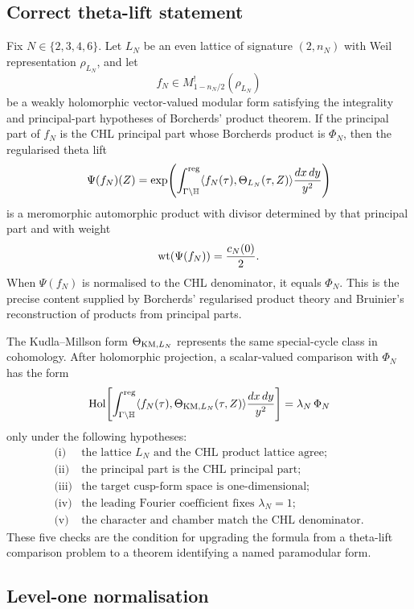 \subsection*{Correct theta-lift statement}

Fix \(N\in\{2,3,4,6\}\).  Let \(L_N\) be an even lattice of signature
\((2,n_N)\) with Weil representation \(\rho_{L_N}\), and let
\[
  f_N\in M^{!}_{1-n_N/2}(\rho_{L_N})
\]
be a weakly holomorphic vector-valued modular form satisfying the
integrality and principal-part hypotheses of Borcherds' product
theorem.  If the principal part of \(f_N\) is the CHL principal part
whose Borcherds product is \(\Phi_N\), then the regularised theta lift
\[
  \Psi(f_N)(Z)
  =
  \exp\!\left(
  \int_{\Gamma\backslash\mathbb{H}}^{\mathrm{reg}}
  \langle f_N(\tau),\Theta_{L_N}(\tau,Z)\rangle
  \frac{dx\,dy}{y^2}
  \right)
\]
is a meromorphic automorphic product with divisor determined by that
principal part and with weight
\[
  \mathrm{wt}(\Psi(f_N))=\frac{c_N(0)}2.
\]
When \(\Psi(f_N)\) is normalised to the CHL denominator, it equals
\(\Phi_N\).  This is the precise content supplied by Borcherds'
regularised product theory and Bruinier's reconstruction of products
from principal parts.

The Kudla--Millson form \(\Theta_{\mathrm{KM},L_N}\) represents the same
special-cycle class in cohomology.  After holomorphic projection, a
scalar-valued comparison with \(\Phi_N\) has the form
\[
  \mathrm{Hol}\!\left[
  \int_{\Gamma\backslash\mathbb{H}}^{\mathrm{reg}}
  \langle f_N(\tau),\Theta_{\mathrm{KM},L_N}(\tau,Z)\rangle
  \frac{dx\,dy}{y^2}
  \right]
  =
  \lambda_N\,\Phi_N
\]
only under the following hypotheses:
\[
\begin{array}{ll}
\text{(i)}&\text{the lattice }L_N\text{ and the CHL product lattice agree;}\\
\text{(ii)}&\text{the principal part is the CHL principal part;}\\
\text{(iii)}&\text{the target cusp-form space is one-dimensional;}\\
\text{(iv)}&\text{the leading Fourier coefficient fixes }\lambda_N=1;\\
\text{(v)}&\text{the character and chamber match the CHL denominator.}
\end{array}
\]
These five checks are the condition for upgrading the formula from a
theta-lift comparison problem to a theorem identifying a named
paramodular form.

\subsection*{Level-one normalisation}


